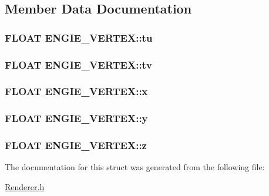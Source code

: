 \subsection{Member Data Documentation}
\hypertarget{struct_e_n_g_i_e___v_e_r_t_e_x_a789127a0b4667146a91eb57c2ad1994f}{
\subsubsection[{tu}]{\setlength{\rightskip}{0pt plus 5cm}F\-L\-O\-A\-T E\-N\-G\-I\-E\-\_\-\-V\-E\-R\-T\-E\-X\-::tu}}\label{struct_e_n_g_i_e___v_e_r_t_e_x_a789127a0b4667146a91eb57c2ad1994f}
\hypertarget{struct_e_n_g_i_e___v_e_r_t_e_x_a3d918e05f43017a1bdd3af89391afe3e}{
\subsubsection[{tv}]{\setlength{\rightskip}{0pt plus 5cm}F\-L\-O\-A\-T E\-N\-G\-I\-E\-\_\-\-V\-E\-R\-T\-E\-X\-::tv}}\label{struct_e_n_g_i_e___v_e_r_t_e_x_a3d918e05f43017a1bdd3af89391afe3e}
\hypertarget{struct_e_n_g_i_e___v_e_r_t_e_x_a435c2dc7562a197f2ff00e6f5887574e}{
\subsubsection[{x}]{\setlength{\rightskip}{0pt plus 5cm}F\-L\-O\-A\-T E\-N\-G\-I\-E\-\_\-\-V\-E\-R\-T\-E\-X\-::x}}\label{struct_e_n_g_i_e___v_e_r_t_e_x_a435c2dc7562a197f2ff00e6f5887574e}
\hypertarget{struct_e_n_g_i_e___v_e_r_t_e_x_adeabf084e472c7f64cc0d9250f1f6470}{
\subsubsection[{y}]{\setlength{\rightskip}{0pt plus 5cm}F\-L\-O\-A\-T E\-N\-G\-I\-E\-\_\-\-V\-E\-R\-T\-E\-X\-::y}}\label{struct_e_n_g_i_e___v_e_r_t_e_x_adeabf084e472c7f64cc0d9250f1f6470}
\hypertarget{struct_e_n_g_i_e___v_e_r_t_e_x_a0847bb638d2734565a9cad5c268afe82}{
\subsubsection[{z}]{\setlength{\rightskip}{0pt plus 5cm}F\-L\-O\-A\-T E\-N\-G\-I\-E\-\_\-\-V\-E\-R\-T\-E\-X\-::z}}\label{struct_e_n_g_i_e___v_e_r_t_e_x_a0847bb638d2734565a9cad5c268afe82}


The documentation for this struct was generated from the following file\-:\begin{DoxyCompactItemize}
\item 
\hyperlink{_renderer_8h}{Renderer.\-h}\end{DoxyCompactItemize}

